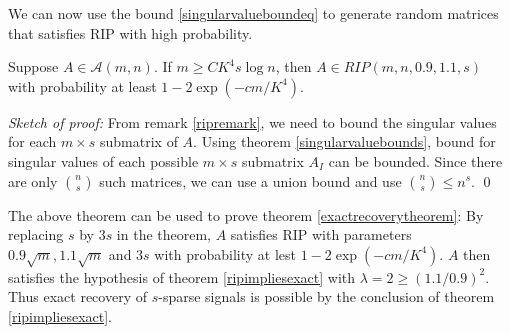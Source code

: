 We can now use the bound \eqref{singularvalueboundeq} to
generate random matrices that satisfies RIP with high probability.

\begin{theorem}\label{randomripprop}
	Suppose $A\in\mathcal{A}(m, n)$. If $m\geq CK^4 s\log n$, then
	$A\in RIP(m, n, 0.9, 1.1, s)$ with probability
	at least $1-2\exp({-cm}/{K^4})$.
\end{theorem}
\noindent
\textit{Sketch of proof:}
	From remark \ref{ripremark}, we need to bound the singular values
	for each $m\times s$ submatrix of $A$.
	Using theorem \ref{singularvaluebounds}, bound for singular
	values of each possible $m\times s$ submatrix $A_I$ can
	be bounded. Since there are only $\binom{n}{s}$ such matrices,
	we can use a union bound and use $\binom{n}{s}\leq n^s$.
	\qed
\indent

\begin{remark}
	The above theorem can be used to prove theorem
	\ref{exactrecoverytheorem}: By replacing $s$ by $3s$
	in the theorem, $A$ satisfies RIP with parameters
	$0.9\sqrt{m}, 1.1\sqrt{m}$ and $3s$ with probability
	at lest $1-2\exp(-cm/K^4)$. 
	$A$ then satisfies the hypothesis of theorem
	\ref{ripimpliesexact} with $\lambda = 2\geq (1.1/0.9)^2$.
	Thus exact recovery of $s$-sparse signals is possible by
	the conclusion of theorem \ref{ripimpliesexact}.
\end{remark}

